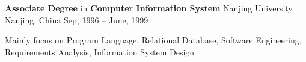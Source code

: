 

\begin{cventries}

  \cventry
    {\textbf{Associate Degree} in \textbf{Computer Information System}} %
    {Nanjing University} %
    {Nanjing, China} %
    {Sep, 1996 – June, 1999} %
    {
      \begin{cvitems} %
        \item {Mainly focus on Program Language, Relational Database, Software Engineering, Requirements Analysis, Information System Design}
      \end{cvitems}
    }
\end{cventries}

